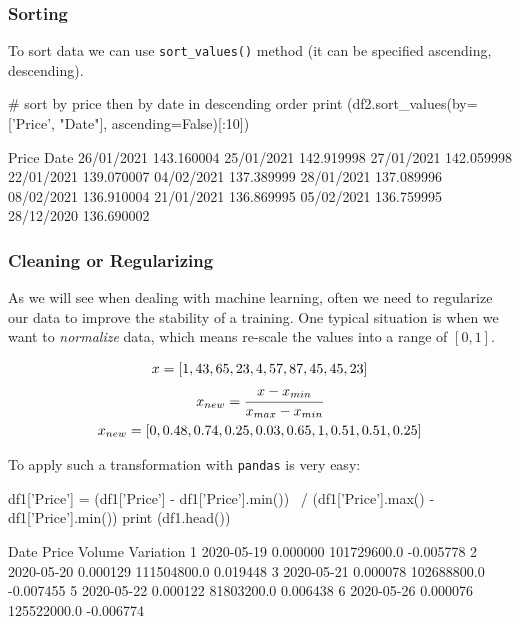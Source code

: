 \subsubsection{Sorting}\label{sorting}

To sort data we can use \texttt{sort\_values()} method (it can be specified ascending, descending).

\begin{ipython}
# sort by price then by date in descending order
print (df2.sort_values(by=['Price', "Date"], ascending=False)[:10])
\end{ipython}
\begin{ioutput}
                 Price
Date                  
26/01/2021  143.160004
25/01/2021  142.919998
27/01/2021  142.059998
22/01/2021  139.070007
04/02/2021  137.389999
28/01/2021  137.089996
08/02/2021  136.910004
21/01/2021  136.869995
05/02/2021  136.759995
28/12/2020  136.690002
\end{ioutput}
        
\subsubsection{Cleaning or Regularizing}
\label{cleaning-or-regularizing}

As we will see when dealing with machine learning, often we need to regularize our data to improve the stability of a training. One typical situation is when we want to \emph{normalize} data, which means re-scale the values into a range of $[0, 1]$.

\begin{equation*}
\begin{gathered}
x = [1,43,65,23,4,57,87,45,45,23]\\
x_{new} = \cfrac{x - x_{min}}{x_{max} - x_{min}}\\
x_{new} = [0,0.48,0.74,0.25,0.03,0.65,1,0.51,0.51,0.25]
\end{gathered}
\end{equation*}

To apply such a transformation with \texttt{pandas} is very easy: 
\begin{ipython}
df1['Price'] = (df1['Price'] - df1['Price'].min()) \
    / (df1['Price'].max() - df1['Price'].min())
print (df1.head())
\end{ipython}
\begin{ioutput}
        Date     Price       Volume  Variation
1 2020-05-19  0.000000  101729600.0  -0.005778
2 2020-05-20  0.000129  111504800.0   0.019448
3 2020-05-21  0.000078  102688800.0  -0.007455
5 2020-05-22  0.000122   81803200.0   0.006438
6 2020-05-26  0.000076  125522000.0  -0.006774
\end{ioutput}
        
